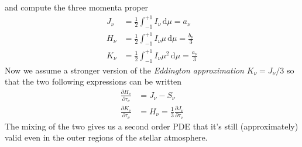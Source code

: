 and compute the three momenta proper
\begin{align}
	J_{\nu} &= \frac{1}{2}\int_{-1}^{+1} I_{\nu}\,\text{d}\mu = a_{\nu}\\
	H_{\nu} &= \frac{1}{2}\int_{-1}^{+1} I_{\nu}\mu\,\text{d}\mu = \frac{b_{\nu}}{3}\\
	K_{\nu} &= \frac{1}{2}\int_{-1}^{+1} I_{\nu}\mu^{2}\,\text{d}\mu = \frac{a_{\nu}}{3}
\end{align}
Now we assume a stronger version of the \emph{Eddington approximation} $K_{\nu} = J_{\nu}/3$ so that the two following expressions can be written 
\begin{align}
	\frac{\partial H_{\nu}}{\partial \tau_{\nu}} &= J_{\nu}-S_{\nu}\\
	\frac{\partial K_{\nu}}{\partial \tau_{\nu}} &= H_{\nu} = \frac{1}{3}\frac{\partial J_{\nu}}{\partial \tau_{\nu}}
\end{align}
The mixing of the two gives us a second order PDE that it's still (approximately) valid even in the outer regions of the stellar atmosphere.
